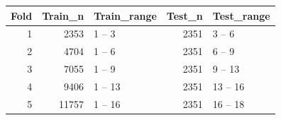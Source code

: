 \begin{tabular}{rrlrl}
\toprule
Fold & Train\_n & Train\_range & Test\_n & Test\_range \\
\midrule
1 & 2353 & 1 -- 3 & 2351 & 3 -- 6 \\
2 & 4704 & 1 -- 6 & 2351 & 6 -- 9 \\
3 & 7055 & 1 -- 9 & 2351 & 9 -- 13 \\
4 & 9406 & 1 -- 13 & 2351 & 13 -- 16 \\
5 & 11757 & 1 -- 16 & 2351 & 16 -- 18 \\
\bottomrule
\end{tabular}
